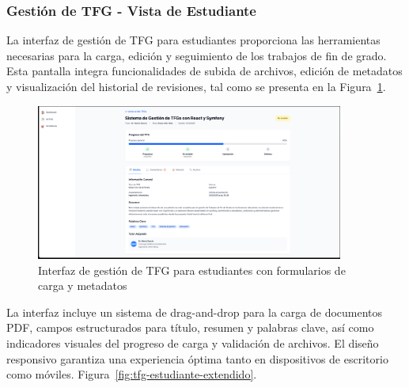 \documentclass[12pt,a4paper,oneside]{report}
\begin{document}
\subsubsection{Gestión de TFG - Vista de Estudiante}\label{gestion-de-tfg---vista-de-estudiante}

La interfaz de gestión de TFG para estudiantes proporciona las herramientas necesarias para la carga, edición y seguimiento de los trabajos de fin de grado. Esta pantalla integra funcionalidades de subida de archivos, edición de metadatos y visualización del historial de revisiones, tal como se presenta en la Figura~\ref{fig:gestion-tfg-estudiante}.

\begin{figure}[H]
\centering
\includegraphics[width=0.9\textwidth]{processed/images/gestion_tfg_estudiante.png}
\caption{Interfaz de gestión de TFG para estudiantes con formularios de carga y metadatos}
\label{fig:gestion-tfg-estudiante}
\end{figure}

La interfaz incluye un sistema de drag-and-drop para la carga de documentos PDF, campos estructurados para título, resumen y palabras clave, así como indicadores visuales del progreso de carga y validación de archivos. El diseño responsivo garantiza una experiencia óptima tanto en dispositivos de escritorio como móviles. Figura~\ref{fig:tfg-estudiante-extendido}.
\end{document}
